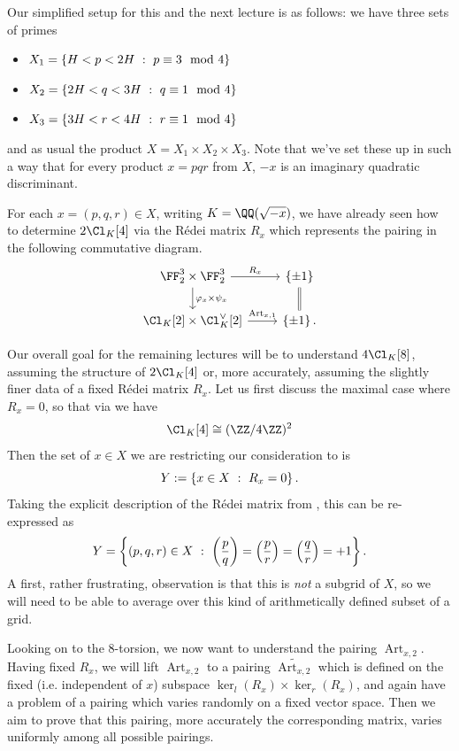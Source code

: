 \documentclass{lecturenotes}
\newcommand{\Art}{\operatorname{Art}}
\newcommand{\kerl}{\ker_{l}}
\newcommand{\kerr}{\ker_{r}}
\numberwithin{equation}{section}
\begin{document}
Our simplified setup for this and the next lecture is as follows: we have three sets of primes
\begin{itemize}
    \item $X_1=\left\{{H<p<2H~:~p\equiv 3\mod 4}\right\}$
    \item $X_2=\left\{{2H<q<3H~:~q\equiv 1\mod 4}\right\}$
    \item $X_3=\left\{{3H<r<4H~:~r\equiv 1\mod 4}\right\}$ 
\end{itemize}
and as usual the product $X=X_1\times X_2\times X_3$.  Note that we've set these up in such a way that for every product $x=pqr$ from $X$, $-x$ is an imaginary quadratic discriminant.

For each $x=(p,q,r)\in X$, writing $K=\QQ(\sqrt{-x})$, we have already seen how to determine $2\Cl_K[4]$ via the R\'edei matrix $R_x$ which represents the pairing in the following commutative diagram.
\[\begin{tikzcd}
    \FF_2^3\times \FF_2^3\ar[r,"R_x"]\ar[d,"\varphi_x\times \psi_x"]&\set{\pm 1}\ar[d,equals]\\
    \Cl_K[2]\times \Cl_K^\vee[2]\ar[r,"\Art_{x,1}"]&\set{\pm 1}.
\end{tikzcd}\]

Our overall goal for the remaining lectures will be to understand $4\Cl_K[8]$, assuming the structure of $2\Cl_K[4]$ or, more accurately, assuming the slightly finer data of a fixed R\'edei matrix $R_x$.  Let us first discuss the maximal case where $R_x=0$, so that via  we have
\[\Cl_K[4]\cong (\ZZ/4\ZZ)^2\]
Then the set of $x\in X$ we are restricting our consideration to is
\[Y:=\left\{{x\in X~:~R_x=0}\right\}.\]
Taking the explicit description of the R\'edei matrix from , this can be re-expressed as
\[Y=\left\{{(p,q,r)\in X~:~\left(\frac{p}{q}\right)=\left(\frac{p}{r}\right)=\left(\frac{q}{r}\right)=+1}\right\}.\]
A first, rather frustrating, observation is that this is \emph{not} a subgrid of $X$, so we will need to be able to average over this kind of arithmetically defined subset of a grid.

Looking on to the $8$-torsion, we now want to understand the pairing $\Art_{x,2}$.  Having fixed $R_x$, we will lift $\Art_{x,2}$ to a pairing $\widetilde{\Art_{x,2}}$ which is defined on the fixed (i.e. independent of $x$) subspace $\kerl(R_x)\times \kerr(R_x)$, and again have a problem of a pairing which varies randomly on a fixed vector space.  Then we aim to prove that this pairing, more accurately the corresponding matrix, varies uniformly among all possible pairings.
\end{document}
